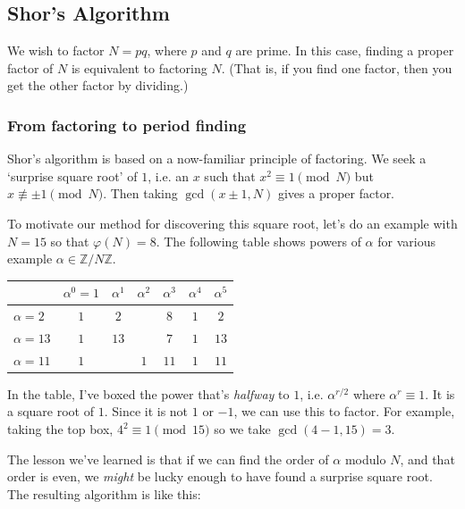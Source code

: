 \documentclass{article}
\theoremstyle{plain}
\theoremstyle{definition}
\theoremstyle{remark}
\numberwithin{theorem}{section}
\newcommand{\ZZ}{\mathbb{Z}}
\begin{document}
\subsection{Shor's Algorithm}

We wish to factor $N = pq$, where $p$ and $q$ are prime.  In this case, finding a proper factor of $N$ is equivalent to factoring $N$.  (That is, if you find one factor, then you get the other factor by dividing.)

\subsubsection{From factoring to period finding}

Shor's algorithm is based on a now-familiar principle of factoring.  We seek a `surprise square root' of $1$, i.e. an $x$ such that $x^2 \equiv 1 \pmod{N}$ but $x \not\equiv \pm 1 \pmod{N}$.  Then taking $\gcd(x \pm 1,N)$ gives a proper factor.

To motivate our method for discovering this square root, let's do an example with $N=15$ so that $\varphi(N) = 8$.  The following table shows powers of $\alpha$ for various example $\alpha \in \ZZ/N\ZZ$.

\begin{center}
\begin{NiceTabular}{l|cccccc}
 & $\alpha^0 =1$ & $\alpha^1$ & $\alpha^2$ & $\alpha^3$ & $\alpha^4$ & $\alpha^5$ \\
 \hline
 $\alpha = 2$ & $1$ & $2$ &   & $8$ & $1$ & $2$  \\
 $\alpha = 13$ & $1$ & $13$ &  & $7$ & $1$ & $13$ \\ %
 $\alpha = 11$ & $1$ &  & $1$ & $11$ & $1$ & $11$ 
\end{NiceTabular}
\end{center}

In the table, I've boxed the power that's \emph{halfway} to $1$, i.e. $\alpha^{r/2}$ where $\alpha^r \equiv 1$.  It is a square root of $1$.  Since it is not $1$ or $-1$, we can use this to factor.  For example, taking the top box, $4^2 \equiv 1 \pmod{15}$ so we take $\gcd(4-1,15) = 3$.

The lesson we've learned is that if we can find the order of $\alpha$ modulo $N$, and that order is even, we \emph{might} be lucky enough to have found a surprise square root.  The resulting algorithm is like this:
\end{document}
